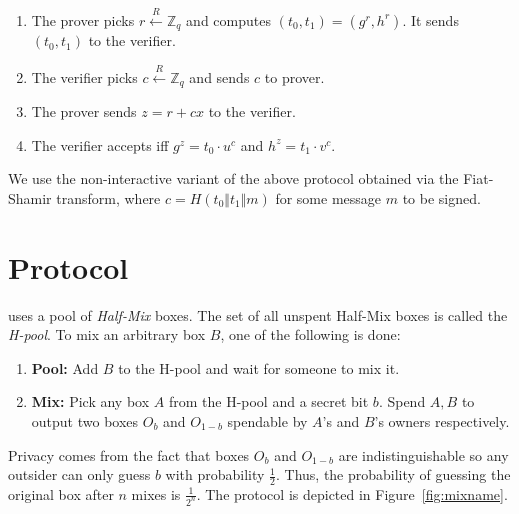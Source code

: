 \documentclass[runningheads]{llncs}
\begin{document}
\begin{enumerate}
	\item The prover picks $r \stackrel{R}{\leftarrow} \mathbb{Z}_q$ and computes $(t_0, t_1) = ({g}^r, {h}^r)$. It sends $(t_0, t_1)$ to the verifier.
	\item The verifier picks $c \stackrel{R}{\leftarrow} \mathbb{Z}_q$ and sends $c$ to prover.
	\item The prover sends $z = r + cx$ to the verifier. 
	\item The verifier accepts iff ${g}^z = {t_0}\cdot {u}^c$ and $h^z=t_1\cdot v^c$.
\end{enumerate}

We use the non-interactive variant of the above protocol obtained via the Fiat-Shamir transform, where $c = H(t_0 \Vert t_1\Vert m)$ for some message $m$ to be signed. 

\section{\algname Protocol}

\algname uses a pool of {\em Half-Mix} boxes. The set of all unspent Half-Mix boxes is called the {\em H-pool}. To mix an arbitrary box $B$, one of the following is done:
\begin{enumerate}
	\item \textbf{Pool:} Add $B$ to the H-pool and wait for someone to mix it.
	\item \textbf{Mix:} Pick any box $A$ from the H-pool and a secret bit $b$. Spend $A, B$ to 
	output two boxes $O_b$ and $O_{1-b}$ spendable by $A$'s and $B$'s owners respectively.
\end{enumerate}

Privacy comes from the fact that boxes $O_b$ and $O_{1-b}$ are indistinguishable so any outsider can only guess $b$ with probability $\frac{1}{2}$. Thus, the probability of guessing the original box after $n$ mixes is $\frac{1}{2^n}$. The protocol is depicted in Figure~\ref{fig:mixname}. 
\end{document}
